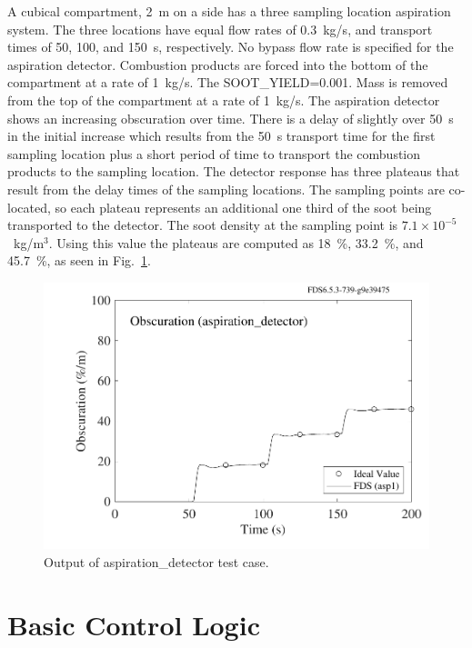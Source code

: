 \documentclass[11pt]{book}
\begin{document}
A cubical compartment, 2~m on a side has a three sampling location aspiration system.  The three locations have equal flow rates of 0.3~kg/s, and transport times of 50, 100, and 150~s, respectively.  No bypass flow rate is specified for the aspiration detector.  Combustion products are forced into the bottom of the compartment at a rate of 1~kg/s. The {\ct SOOT\_YIELD=0.001}. Mass is removed from the top of the compartment at a rate of 1~kg/s. The aspiration detector shows an increasing obscuration over time.  There is a delay of slightly over 50~s in the initial increase which results from the 50~s transport time for the first sampling location plus a short period of time to transport the combustion products to the sampling location.  The detector response has three plateaus that result from the delay times of the sampling locations.  The sampling points are co-located, so each plateau represents an additional one third of the soot being transported to the detector.  The soot density at the sampling point is $7.1 \times 10^{-5}$~kg/m$^3$.  Using this value the plateaus are computed as 18~\%, 33.2~\%, and 45.7~\%, as seen in Fig.~\ref{aspiration_detector}.

\begin{figure}[ht]
\begin{center}
\includegraphics[width=4.in]{SCRIPT_FIGURES/aspiration_detector}
\end{center}
\caption[Results of the {\ct aspiration\_detector} test case]{Output of {\ct aspiration\_detector} test case.}
\label{aspiration_detector}
\end{figure}



\section{Basic Control Logic}
\label{info:basic_control}
\end{document}
